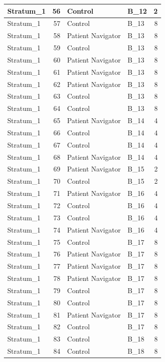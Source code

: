 \documentclass[
]{book}
\begin{document}
\begin{table}[H]
\begin{tabular}{l|r|l|l|r}
\hline
Stratum\_1 & 56 & Control & B\_12 & 2\\
\hline
Stratum\_1 & 57 & Control & B\_13 & 8\\
\hline
Stratum\_1 & 58 & Patient Navigator & B\_13 & 8\\
\hline
Stratum\_1 & 59 & Control & B\_13 & 8\\
\hline
Stratum\_1 & 60 & Patient Navigator & B\_13 & 8\\
\hline
Stratum\_1 & 61 & Patient Navigator & B\_13 & 8\\
\hline
Stratum\_1 & 62 & Patient Navigator & B\_13 & 8\\
\hline
Stratum\_1 & 63 & Control & B\_13 & 8\\
\hline
Stratum\_1 & 64 & Control & B\_13 & 8\\
\hline
Stratum\_1 & 65 & Patient Navigator & B\_14 & 4\\
\hline
Stratum\_1 & 66 & Control & B\_14 & 4\\
\hline
Stratum\_1 & 67 & Control & B\_14 & 4\\
\hline
Stratum\_1 & 68 & Patient Navigator & B\_14 & 4\\
\hline
Stratum\_1 & 69 & Patient Navigator & B\_15 & 2\\
\hline
Stratum\_1 & 70 & Control & B\_15 & 2\\
\hline
Stratum\_1 & 71 & Patient Navigator & B\_16 & 4\\
\hline
Stratum\_1 & 72 & Control & B\_16 & 4\\
\hline
Stratum\_1 & 73 & Control & B\_16 & 4\\
\hline
Stratum\_1 & 74 & Patient Navigator & B\_16 & 4\\
\hline
Stratum\_1 & 75 & Control & B\_17 & 8\\
\hline
Stratum\_1 & 76 & Patient Navigator & B\_17 & 8\\
\hline
Stratum\_1 & 77 & Patient Navigator & B\_17 & 8\\
\hline
Stratum\_1 & 78 & Patient Navigator & B\_17 & 8\\
\hline
Stratum\_1 & 79 & Control & B\_17 & 8\\
\hline
Stratum\_1 & 80 & Control & B\_17 & 8\\
\hline
Stratum\_1 & 81 & Patient Navigator & B\_17 & 8\\
\hline
Stratum\_1 & 82 & Control & B\_17 & 8\\
\hline
Stratum\_1 & 83 & Control & B\_18 & 8\\
\hline
Stratum\_1 & 84 & Control & B\_18 & 8\\

\end{tabular}
\end{table}
\end{document}
